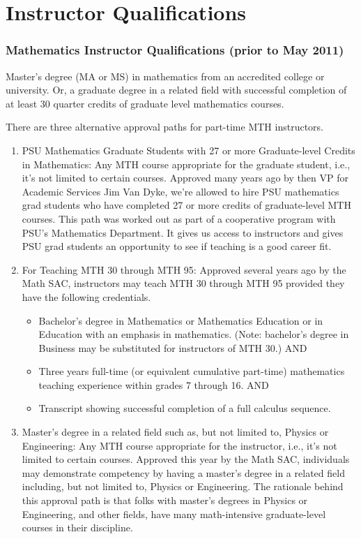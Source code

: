 \chapter{Instructor Qualifications}\label{app:sec:instructorquals}
\subsection{Mathematics Instructor Qualifications (prior to May 2011)}
Master's degree (MA or MS) in mathematics from an accredited college or university.  Or, a graduate degree in a related field with successful completion of at least 30 quarter credits of graduate level mathematics courses.

There are three alternative approval paths for part-time MTH instructors.
\begin{enumerate}
  \item PSU Mathematics Graduate Students with 27 or more Graduate-level Credits in Mathematics: Any MTH course appropriate for the graduate student, i.e., it's not limited to certain courses. Approved many years ago by then VP for Academic Services Jim Van Dyke, we're allowed to hire PSU mathematics grad students who have completed 27 or more credits of graduate-level MTH courses. This path was worked out as part of a cooperative program with PSU's Mathematics Department. It gives us access to instructors and gives PSU grad students an opportunity to see if teaching is a good career fit.
  \item For Teaching MTH 30 through MTH 95: Approved several years ago by the Math SAC, instructors may teach MTH 30 through MTH 95 provided they have the following credentials.
    \begin{itemize}
      \item Bachelor's degree in Mathematics or Mathematics Education or in Education with an emphasis in mathematics. (Note: bachelor's degree in Business may be substituted for instructors of MTH 30.)
        AND
      \item Three years full-time (or equivalent cumulative part-time) mathematics teaching experience within grades 7 through 16.
        AND
      \item Transcript showing successful completion of a full calculus sequence.
    \end{itemize}
  \item Master's degree in a related field such as, but not limited to, Physics or Engineering: Any MTH course appropriate for the instructor, i.e., it's not limited to certain courses. Approved this year by the Math SAC, individuals may demonstrate competency by having a master's degree in a related field including, but not limited to, Physics or Engineering. The rationale behind this approval path is that folks with master's degrees in Physics or Engineering, and other fields, have many math-intensive graduate-level courses in their discipline.
\end{enumerate}

